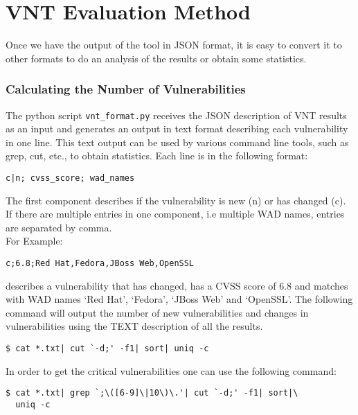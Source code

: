 \chapter{VNT Evaluation Method}
\label{vnt_evaluation_method}
Once we have the output of the tool in JSON format, it is easy to convert it to other formats to do an analysis of the results or obtain some statistics. 
\subsection{Calculating the Number of Vulnerabilities}
The python script \texttt{vnt\_format.py} receives the JSON description of VNT results as an input and generates an output in text format describing each vulnerability in one line. This text output can be used by various command line tools, such as grep, cut, etc., to obtain statistics. 
Each line is in the following format:
\begin{framed}

\texttt{c|n;%
cvss\_score;%
wad\_names
}

\end{framed}
The first component describes if the vulnerability is new (n) or has changed (c). If there are multiple entries in one component, i.e multiple WAD names, entries are separated by comma.
\\
For Example:
\begin{framed}
\texttt{c;6.8;Red Hat,Fedora,JBoss Web,OpenSSL}
\end{framed}
describes a vulnerability that has changed, has a CVSS score of 6.8 and matches with WAD names `Red Hat', `Fedora', `JBoss Web' and `OpenSSL'.
The following command will output the number of new vulnerabilities and changes in vulnerabilities using the TEXT description of all the results. 
\begin{framed}
\begin{verbatim}
$ cat *.txt| cut `-d;' -f1| sort| uniq -c
\end{verbatim}
\end{framed}
In order to get the critical vulnerabilities one can use the following command:
\begin{framed}
\begin{verbatim}
$ cat *.txt| grep `;\([6-9]\|10\)\.'| cut `-d;' -f1| sort|\
  uniq -c
\end{verbatim}
\end{framed}
